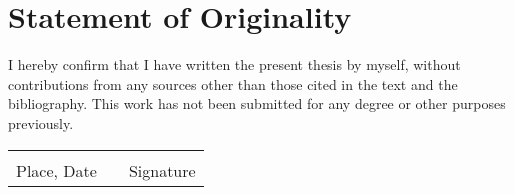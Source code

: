 \chapter{Statement of Originality}

I hereby confirm that I have written the present thesis by myself, without contributions from any sources other than those cited in the text and the bibliography.
This work has not been submitted for any degree or other purposes previously.

\vspace{4cm}

\noindent
\begin{tabular}{@{}p{2.55in}@{}p{1in}p{2.55in}@{}}
    \dotfill & & \dotfill \\
    Place, Date & & Signature\\
\end{tabular}